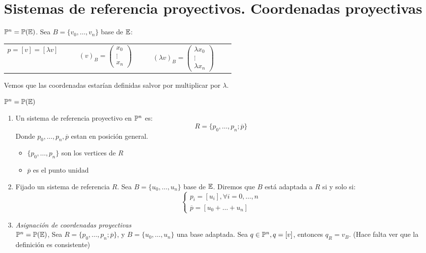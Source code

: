 \section{Sistemas de referencia proyectivos. Coordenadas proyectivas}

\begin{obs}
    $\mathbb{P}^n = \mathbb{P}(\mathbb{E})$. Sea $B = \{v_0, \dots, v_n\}$ base de $\mathbb{E}$:
    \begin{center} \begin{tabular}{ccc}
        $p = [v] = [\lambda v] \qquad $ &
        $(v)_B = \begin{pmatrix} x_0 \\ \vdots \\ x_n \end{pmatrix}\qquad $&
        $(\lambda v)_B = \begin{pmatrix} \lambda x_0 \\ \vdots \\ \lambda x_n \end{pmatrix} \qquad$
    \end{tabular} \end{center}
    Vemos que las coordenadas estarían definidas salvor por multiplicar por $\lambda$.
\end{obs}
\begin{defi}
    $\mathbb{P}^n = \mathbb{P}(\mathbb{E})$
    \begin{enumerate}
        \item Un sistema de referencia proyectivo en $\mathbb{P}^n$ es:
            \[ R= \{ p_0, \dots, p_n; \overline{p} \} \]
            Donde $p_0, \dots, p_n, \overline{p}$ estan en posición general.
            \begin{itemize}
                \item $\{ p_0, \dots, p_n \}$ son los vertices de $R$
                \item $\overline{p}$ es el punto unidad
            \end{itemize}
        \item Fijado un sistema de referencia $R$. Sea $B = \{ u_0, \dots, u_n \}$ base de $\mathbb{E}$. Diremos que $B$ está adaptada a $R$ si y solo si:
            \[ \begin{cases} p_i = [u_i], \forall i = 0, \dots, n \\ \overline{p} = [u_0 + \dots + u_n ] \end{cases} \]
        \item \textit{Asignación de coordenadas proyectivas} \\
            $\mathbb{P}^n = \mathbb{P}(\mathbb{E})$, Sea $R = \{ p_0, \dots, p_n; \overline{p} \}$, y $B = \{u_0, \dots, u_n\}$ una base adaptada. Sea $q \in \mathbb{P}^n, q = [v]$, entonces
            $q_R = v_B$. (Hace falta ver que la definición es consistente)
    \end{enumerate}
\end{defi}
